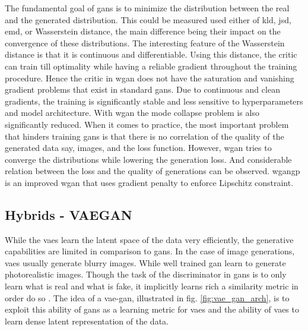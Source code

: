 

The fundamental goal of \acp{gan} is to minimize the distribution between the real and the generated distribution. This could be measured used either of \ac{kld}, \ac{jsd}, \ac{emd}, or Wasserstein distance, the main difference being their impact on the convergence of these distributions. The interesting feature of the Wasserstein distance is that it is continuous and differentiable. Using this distance, the critic can train till optimality while having a reliable gradient throughout the training procedure. Hence the critic in \ac{wgan} does not have the saturation and vanishing gradient problems that exist in standard \acp{gan}. Due to continuous and clean gradients, the training is significantly stable and less sensitive to hyperparameters and model architecture. With \ac{wgan} the mode collapse problem is also significantly reduced. When it comes to practice, the most important problem that hinders training \acp{gan} is that there is no correlation of the quality of the generated data say, images, and the loss function. However, \ac{wgan} tries to converge the distributions while lowering the generation loss. And considerable relation between the loss and the quality of generations can be observed. \ac{wgangp} \cite{wgangp} is an improved \ac{wgan} that uses gradient penalty to enforce Lipschitz constraint.

\subsection{Hybrids - VAEGAN}
\label{subsec:vaeganhybrid}
While the \acp{vae} learn the latent space of the data very efficiently, the generative capabilities are limited in comparison to \acp{gan}. In the case of image generations, \acp{vae} usually generate blurry images. While well trained \ac{gan} learn to generate photorealistic images. Though the task of the discriminator in \acp{gan} is to only learn what is real and what is fake, it implicitly learns rich a similarity metric in order do so \cite{autoencoding_beyond_pixels}. The idea of a \ac{vae}-\ac{gan}, illustrated in fig. \ref{fig:vae_gan_arch}, is to exploit this ability of \acp{gan} as a learning metric for \acp{vae} and the ability of \acp{vae} to learn dense latent representation of the data.

